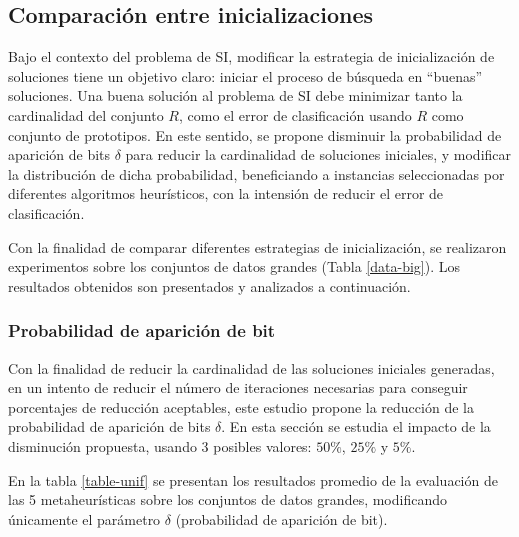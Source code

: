 \subsection{Comparación entre inicializaciones}
\label{sec-comp-inits}

Bajo el contexto del problema de SI, modificar la estrategia de inicialización de soluciones tiene un objetivo claro: iniciar el proceso de búsqueda en ``buenas'' soluciones. Una buena solución al problema de SI debe minimizar tanto la cardinalidad del conjunto $R$, como el error de clasificación usando $R$ como conjunto de prototipos. En este sentido, se propone disminuir la probabilidad de aparición de bits $\delta$ para reducir la cardinalidad de soluciones iniciales, y modificar la distribución de dicha probabilidad, beneficiando a instancias seleccionadas por diferentes algoritmos heurísticos, con la intensión de reducir el error de clasificación.

Con la finalidad de comparar diferentes estrategias de inicialización, se realizaron experimentos sobre los conjuntos de datos grandes (Tabla \ref{data-big}). Los resultados obtenidos son presentados y analizados a continuación.

\subsubsection{Probabilidad de aparición de bit}

Con la finalidad de reducir la cardinalidad de las soluciones iniciales generadas, en un intento de reducir el número de iteraciones necesarias para conseguir porcentajes de reducción aceptables, este estudio propone la reducción de la probabilidad de aparición de bits $\delta$. En esta sección se estudia el impacto de la disminución propuesta, usando 3 posibles valores: $50\%$, $25\%$ y $5\%$.

En la tabla \ref{table-unif} se presentan los resultados promedio de la evaluación de las 5 metaheurísticas sobre los conjuntos de datos grandes, modificando únicamente el parámetro $\delta$ (probabilidad de aparición de bit).

